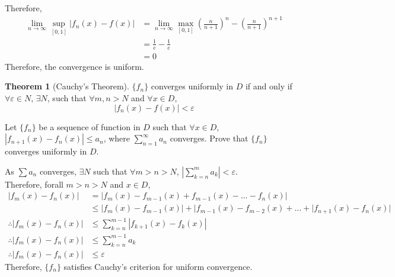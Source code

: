 \documentclass[fleqn, a4paper, 12pt, twoside]{article}
\theoremstyle{definition}
\theoremstyle{theorem}
\newtheorem{theorem}{Theorem}
\begin{document}
\begin{solution}
	Therefore,
	\begin{align*}
		\lim\limits_{n \to \infty} \sup\limits_{[0,1]} \left| f_n(x) - f(x) \right| & = \lim\limits_{n \to \infty} \max\limits_{[0,1]} \left( \frac{n}{n + 1} \right)^n - \left( \frac{n}{n + 1} \right)^{n + 1} \\
                                                                                            & = \frac{1}{e} - \frac{1}{e}                                                                                                \\
                                                                                            & = 0
	\end{align*}
	Therefore, the convergence is uniform.
\end{solution}

\begin{theorem}[Cauchy's Theorem]
	$\{f_n\}$ converges uniformly in $D$ if and only if $\forall \varepsilon \in N$, $\exists N$, such that $\forall m, n > N$ and $\forall x \in D$,
	\begin{equation*}
		|f_n(x) - f(x)| < \varepsilon
	\end{equation*}
	\label{Cauchy's_Theorem}
\end{theorem}

\begin{question}
	Let $\{f_n\}$ be a sequence of function in $D$ such that $\forall x \in D$, $|f_{n + 1}(x) - f_n(x)| \le a_n$, where $\sum\limits_{n = 1}^{\infty} a_n$ converges.
	Prove that $\{f_n\}$ converges uniformly in $D$.
\end{question}

\begin{solution}
	As $\sum a_n$ converges, $\exists N$ such that $\forall m > n > N$, $\left| \sum\limits_{k = n}^{m} a_k \right| < \varepsilon$.\\
	Therefore, forall $m > n > N$ and $x \in D$,
	\begin{align*}
		|f_m(x) - f_n(x)|            & = |f_m(x) - f_{m - 1}(x) + f_{m - 1}(x) - \dots - f_n(x)|                                    \\
                                             & \le |f_m(x) - f_{m - 1}(x)| + |f_{m - 1}(x) - f_{m - 2}(x) + \dots + |f_{n + 1}(x) - f_n(x)| \\
		\therefore |f_m(x) - f_n(x)| & \le \sum\limits_{k = n}^{m - 1} |f_{k + 1}(x) - f_k(x)|                                      \\
		\therefore |f_m(x) - f_n(x)| & \le \sum\limits_{k = n}^{m - 1} a_k                                                          \\
		\therefore |f_m(x) - f_n(x)| & \le \varepsilon\
	\end{align*}
	Therefore, $\{f_n\}$ satisfies Cauchy's criterion for uniform convergence.
\end{solution}
\end{document}
